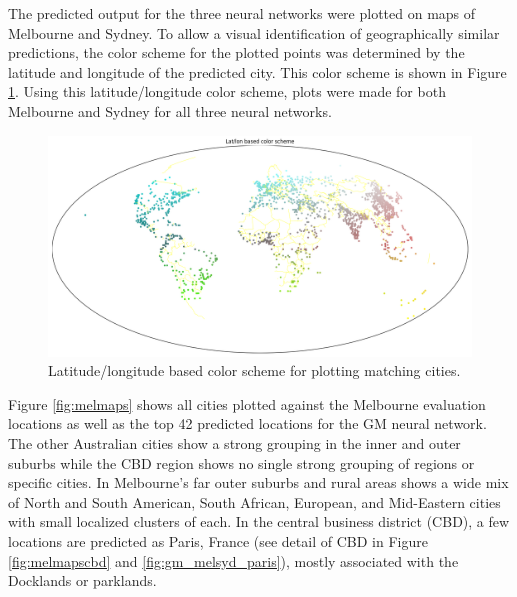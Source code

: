 \documentclass[sageh,times]{sagej}
\begin{document}
The predicted output for the three neural networks were plotted on maps of Melbourne and Sydney. To allow a visual identification of geographically similar predictions, the color scheme for the plotted points was determined by the latitude and longitude of the predicted city. This color scheme is shown in Figure \ref{fig:colorscheme}. Using this latitude/longitude color scheme, plots were made for both Melbourne and Sydney for all three neural networks.

\begin{figure}[!htbp]
\centering    
\includegraphics[scale=0.25]{Images/World_map_color_scheme.png} 
\caption{Latitude/longitude based color scheme for plotting matching cities.}    
 \label{fig:colorscheme}  
\end{figure} 


Figure \ref{fig:melmaps} shows all cities plotted against the Melbourne evaluation locations as well as the top 42 predicted locations for the GM neural network. The other Australian cities show a strong grouping in the inner and outer suburbs while the CBD region shows no single strong grouping of regions or specific cities. In Melbourne's far outer suburbs and rural areas shows a wide mix of North and South American, South African, European, and Mid-Eastern cities with small localized clusters of each. In the central business district (CBD), a few locations are predicted as Paris, France (see detail of CBD in Figure \ref{fig:melmapscbd} and \ref{fig:gm_melsyd_paris}), mostly associated with the Docklands or parklands.
\end{document}
